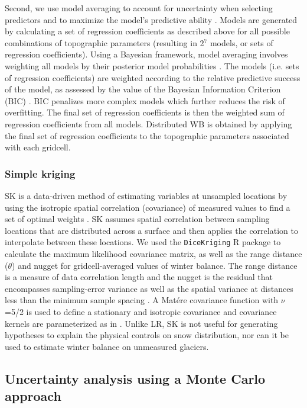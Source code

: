 \documentclass[twocolumn, letterpaper]{igs}
\begin{document}
Second, we use model averaging to account for uncertainty when selecting predictors and to maximize the model's predictive ability \citep{Madigan1994}. Models are generated by calculating a set of regression coefficients as described above for all possible combinations of topographic parameters (resulting in 2$^7$ models, or sets of regression coefficients). Using a Bayesian framework, model averaging involves weighting all models by their posterior model probabilities \citep{Raftery1997}. The models (i.e. sets of regression coefficients) are weighted according to the relative predictive success of the model, as assessed by the value of the Bayesian Information Criterion (BIC) \citep{Burnham2004}. BIC penalizes more complex models which further reduces the risk of overfitting. The final set of regression coefficients is then the weighted sum of regression coefficients from all models. Distributed WB is obtained by applying the final set of regression coefficients to the topographic parameters associated with each gridcell. 

\subsubsection{Simple kriging}

SK is a data-driven method of estimating variables at unsampled locations by using the isotropic spatial correlation (covariance) of measured values to find a set of optimal weights \citep{Davis1986, Li2008}. SK assumes spatial correlation between sampling locations that are distributed across a surface and then applies the correlation to interpolate between these locations. We used the \texttt{DiceKriging} R package \citep{Roustant2012} to calculate the maximum likelihood covariance matrix, as well as the range distance ($\theta$) and nugget for gridcell-averaged values of winter balance. The range distance is a measure of data correlation length and the nugget is the residual that encompasses sampling-error variance as well as the spatial variance at distances less than the minimum sample spacing \citep{Li2008}. A Mat\'ere covariance function with $\nu$=5/2 is used to define a stationary and isotropic covariance and covariance kernels are parameterized as in \cite{Rasmussen2006}. Unlike LR, SK is not useful for generating hypotheses to explain the physical controls on snow distribution, nor can it be used to estimate winter balance on unmeasured glaciers.


\subsection{Uncertainty analysis using a Monte Carlo approach}
\end{document}
